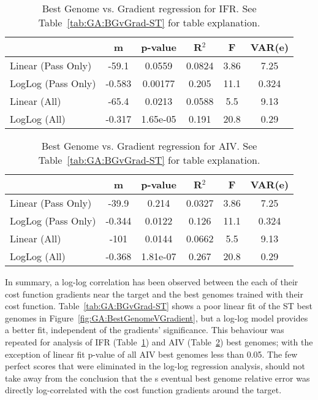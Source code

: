 \begin{table}[th]
  \centering
  \begin{tabular}{lccccc}
                   &   m    & p-value  & R$^2$  &   F  & VAR(e) \\[1ex] \hline
Linear (Pass Only) & -59.1  &  0.0559  & 0.0824 & 3.86 & 7.25    \\
LogLog (Pass Only) & -0.583 & 0.00177  & 0.205  & 11.1 & 0.324  \\[0.5ex] \hline
   Linear (All)    & -65.4  &  0.0213  & 0.0588 & 5.5  & 9.13     \\
   LogLog (All)    & -0.317 & 1.65e-05 & 0.191  & 20.8 & 0.29   \\[1ex] \hline    
\end{tabular}
  \caption{Best Genome vs. Gradient regression for IFR. See Table~\ref{tab:GA:BGvGrad-ST} for table explanation.}
  \label{tab:GA:BGvGrad-IFR}
\end{table}


\begin{table}[th]
  \centering
  \begin{tabular}{lccccc}
                   &   m    & p-value  & R$^2$  &  F   & VAR(e)\\[1ex] \hline
Linear (Pass Only) & -39.9  &  0.214   & 0.0327 & 3.86 & 7.25 \\
LogLog (Pass Only) & -0.344 &  0.0122  & 0.126  & 11.1 & 0.324\\[0.5ex] \hline
   Linear (All)    &  -101  &  0.0144  & 0.0662 & 5.5  & 9.13 \\
   LogLog (All)    & -0.368 & 1.81e-07 & 0.267  & 20.8 & 0.29 \\[1ex] \hline    
\end{tabular}
  \caption{Best Genome vs. Gradient regression for AIV.  See Table~\ref{tab:GA:BGvGrad-ST} for table explanation.}
  \label{tab:GA:BGvGrad-AIV}
\end{table}



In summary, a log-log correlation has been observed between the each
of their cost function gradients near the target and the best genomes
trained with their cost function. Table~\ref{tab:GA:BGvGrad-ST} shows
a poor linear fit of the ST best genomes in
Figure~\ref{fig:GA:BestGenomeVGradient}, but a log-log model provides
a better fit, independent of the gradients' significance. This
behaviour was repeated for analysis of IFR
(Table~\ref{tab:GA:BGvGrad-IFR}) and AIV
(Table~\ref{tab:GA:BGvGrad-AIV}) best genomes; with the exception of
linear fit p-value of all AIV best genomes less than 0.05.  The few
perfect scores that were eliminated in the log-log regression
analysis, should not take away from the conclusion that the {\GA}s
eventual best genome relative error was directly log-correlated with
the cost function gradients around the target.




